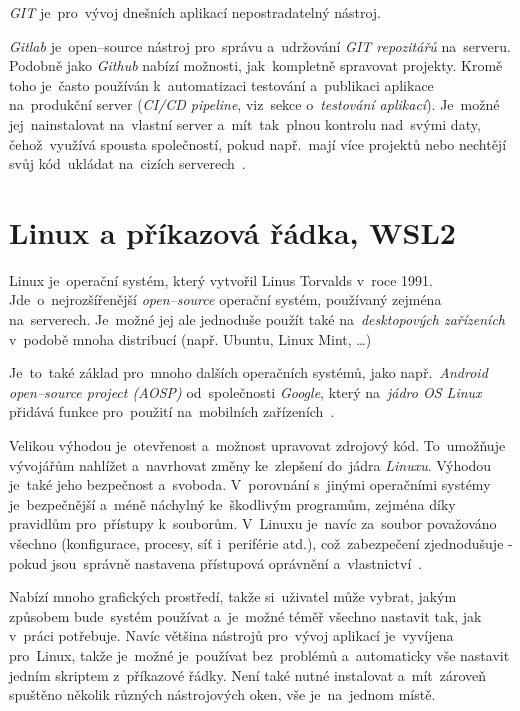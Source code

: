 \documentclass[11pt,a4paper]{report}
\begin{document}
            \emph{GIT} je~pro~vývoj dnešních aplikací nepostradatelný nástroj.
            
            \emph{Gitlab} je~open--source nástroj pro~správu a~udržování \emph{GIT repozitářů} na~serveru. Podobně jako \emph{Github} nabízí možnosti, jak~kompletně spravovat projekty. Kromě toho je~často používán k~automatizaci testování a~publikaci aplikace na~produkční server (\emph{CI/CD pipeline}, viz~sekce o~\emph{testování aplikací}). Je~možné jej~nainstalovat na~vlastní server a~mít~tak~plnou kontrolu nad~svými daty, čehož~využívá spousta společností, pokud např.~mají více projektů nebo nechtějí svůj kód~ukládat na~cizích serverech~\cite{gitlab:panek2019optimalizace, gitlab:CICD, gitlab:actions}.

        \section{Linux a příkazová řádka, WSL2}
            Linux je~operační systém, který vytvořil Linus Torvalds v~roce 1991. Jde~o~nejrozšířenější \emph{open--source} operační systém, používaný zejména na~serverech. Je~možné jej ale jednoduše použít také na~\emph{desktopových zařízeních} v~podobě mnoha distribucí (např. Ubuntu, Linux Mint, \dots)
            
            Je~to~také základ pro~mnoho dalších operačních systémů, jako např.~\emph{Android \emph{open--source} project (\emph{AOSP})} od~společnosti \emph{Google}, který na~\emph{jádro OS Linux} přidává funkce pro~použití na~mobilních zařízeních~\cite{AOSP:linux}.
            
            Velikou výhodou je~otevřenost a~možnost upravovat zdrojový kód. To~umožňuje vývojářům nahlížet a~navrhovat změny ke~zlepšení do~jádra \emph{Linuxu}. Výhodou je~také jeho bezpečnost a~svoboda. V~porovnání s~jinými operačními systémy je~bezpečnější a~méně náchylný ke~škodlivým programům, zejména díky pravidlům pro~přístupy k~souborům. V~Linuxu je~navíc za~soubor považováno všechno (konfigurace, procesy, síť i~periférie atd.), což~zabezpečení zjednodušuje - pokud jsou~správně nastavena přístupová oprávnění a~vlastnictví~\cite{medium:LinuxSecure}.

            Nabízí mnoho grafických prostředí, takže si~uživatel může vybrat, jakým způsobem bude~systém používat a~je~možné téměř všechno nastavit tak, jak v~práci potřebuje. Navíc většina nástrojů pro~vývoj aplikací je~vyvíjena pro~Linux, takže je~možné je~používat bez~problémů a~automaticky vše nastavit jedním skriptem z~příkazové řádky. Není také nutné instalovat a~mít~zároveň spuštěno několik různých nástrojových oken, vše je~na~jednom místě.
\end{document}
